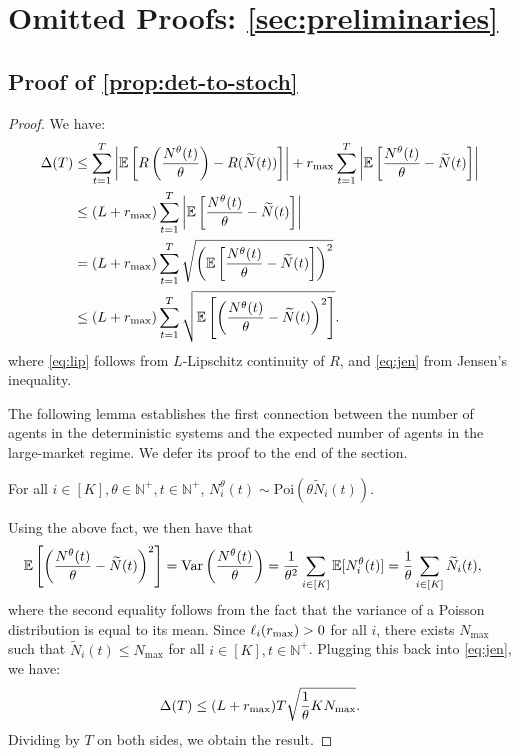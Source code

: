 \documentclass[12pt]{article}
\begin{document}
\appendix
\section{Omitted Proofs: \cref{sec:preliminaries}}

\subsection{Proof of \cref{prop:det-to-stoch}}
\begin{proof}
We have:
\begin{align}
    \Delta(T)
    &\leq\sum_{t=1}^T\left\lvert\mathbb{E}\left[R\left(\frac{N^\theta(t)}{\theta}\right)-R(\widetilde{N}(t))\right]\right\rvert +  r_{\max}\sum_{t=1}^T\left\lvert\mathbb{E}\left[\frac{N^\theta(t)}{\theta} - \widetilde{N}(t)\right]\right\rvert \notag \\
    &\leq (L+r_{\max})\sum_{t=1}^T \left\lvert\mathbb{E}\left[\frac{N^\theta(t)}{\theta} - \widetilde{N}(t)\right]\right\rvert \label{eq:lip}\\
    &= (L+r_{\max})\sum_{t=1}^T\sqrt{\left(\mathbb{E}\left[\frac{N^\theta(t)}{\theta} - \widetilde{N}(t)\right]\right)^2} \notag \\
    &\leq (L+r_{\max})\sum_{t=1}^T\sqrt{\mathbb{E}\left[\left(\frac{N^\theta(t)}{\theta} - \widetilde{N}(t)\right)^2\right]} \label{eq:jen}.
\end{align}
where \eqref{eq:lip} follows from $L$-Lipschitz continuity of $R$, and \eqref{eq:jen} from Jensen's inequality.

The following lemma establishes the first connection between the number of agents in the deterministic systems and the expected number of agents in the large-market regime. We defer its proof to the end of the section.

\begin{lemma}\label{lem:det-stoch-num}
For all $i \in [K], \theta \in \mathbb{N}^+, t \in \mathbb{N}^+$, $N_i^\theta(t) \sim \text{Poi}(\theta\widetilde{N}_i(t))$.
\end{lemma}

Using the above fact, we then have that
\begin{align*}
\mathbb{E}\left[\left(\frac{N^\theta(t)}{\theta} - \widetilde{N}(t)\right)^2\right] &= \text{Var}\left(\frac{N^\theta(t)}{\theta}\right) 
= \frac{1}{\theta^2}\sum_{i\in[K]}\mathbb{E}[N_i^\theta(t)]
= \frac{1}{\theta}\sum_{i\in[K]}\widetilde{N}_i(t),
\end{align*}
where the second equality follows from the fact that the variance of a Poisson distribution is equal to its mean.
Since $\ell_i(r_{\max}) > 0$ for all $i$, there exists $N_{\max}$ such that $\widetilde{N}_i(t) \leq N_{\max}$ for all $i \in [K], t \in \mathbb{N}^+$. Plugging this back into \eqref{eq:jen}, we have:
\begin{align*}
    \Delta(T) \leq (L+r_{\max})T\sqrt{\frac1\theta K N_{\max}}.
\end{align*}
Dividing by $T$ on both sides, we obtain the result.
\end{proof}
\end{document}
